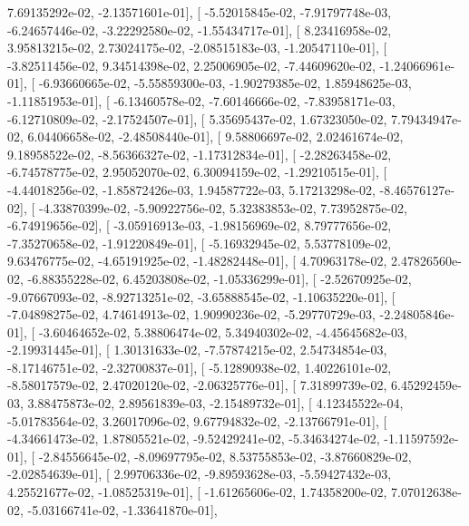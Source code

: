 \documentclass{article}
\begin{document}
          7.69135292e-02,  -2.13571601e-01],
       [ -5.52015845e-02,  -7.91797748e-03,  -6.24657446e-02,
         -3.22292580e-02,  -1.55434717e-01],
       [  8.23416958e-02,   3.95813215e-02,   2.73024175e-02,
         -2.08515183e-03,  -1.20547110e-01],
       [ -3.82511456e-02,   9.34514398e-02,   2.25006905e-02,
         -7.44609620e-02,  -1.24066961e-01],
       [ -6.93660665e-02,  -5.55859300e-03,  -1.90279385e-02,
          1.85948625e-03,  -1.11851953e-01],
       [ -6.13460578e-02,  -7.60146666e-02,  -7.83958171e-03,
         -6.12710809e-02,  -2.17524507e-01],
       [  5.35695437e-02,   1.67323050e-02,   7.79434947e-02,
          6.04406658e-02,  -2.48508440e-01],
       [  9.58806697e-02,   2.02461674e-02,   9.18958522e-02,
         -8.56366327e-02,  -1.17312834e-01],
       [ -2.28263458e-02,  -6.74578775e-02,   2.95052070e-02,
          6.30094159e-02,  -1.29210515e-01],
       [ -4.44018256e-02,  -1.85872426e-03,   1.94587722e-03,
          5.17213298e-02,  -8.46576127e-02],
       [ -4.33870399e-02,  -5.90922756e-02,   5.32383853e-02,
          7.73952875e-02,  -6.74919656e-02],
       [ -3.05916913e-03,  -1.98156969e-02,   8.79777656e-02,
         -7.35270658e-02,  -1.91220849e-01],
       [ -5.16932945e-02,   5.53778109e-02,   9.63476775e-02,
         -4.65191925e-02,  -1.48282448e-01],
       [  4.70963178e-02,   2.47826560e-02,  -6.88355228e-02,
          6.45203808e-02,  -1.05336299e-01],
       [ -2.52670925e-02,  -9.07667093e-02,  -8.92713251e-02,
         -3.65888545e-02,  -1.10635220e-01],
       [ -7.04898275e-02,   4.74614913e-02,   1.90990236e-02,
         -5.29770729e-03,  -2.24805846e-01],
       [ -3.60464652e-02,   5.38806474e-02,   5.34940302e-02,
         -4.45645682e-03,  -2.19931445e-01],
       [  1.30131633e-02,  -7.57874215e-02,   2.54734854e-03,
         -8.17146751e-02,  -2.32700837e-01],
       [ -5.12890938e-02,   1.40226101e-02,  -8.58017579e-02,
          2.47020120e-02,  -2.06325776e-01],
       [  7.31899739e-02,   6.45292459e-03,   3.88475873e-02,
          2.89561839e-03,  -2.15489732e-01],
       [  4.12345522e-04,  -5.01783564e-02,   3.26017096e-02,
          9.67794832e-02,  -2.13766791e-01],
       [ -4.34661473e-02,   1.87805521e-02,  -9.52429241e-02,
         -5.34634274e-02,  -1.11597592e-01],
       [ -2.84556645e-02,  -8.09697795e-02,   8.53755853e-02,
         -3.87660829e-02,  -2.02854639e-01],
       [  2.99706336e-02,  -9.89593628e-03,  -5.59427432e-03,
          4.25521677e-02,  -1.08525319e-01],
       [ -1.61265606e-02,   1.74358200e-02,   7.07012638e-02,
         -5.03166741e-02,  -1.33641870e-01],
\end{document}
